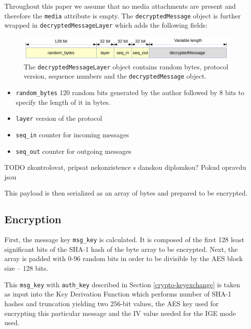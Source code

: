 \documentclass[thesis=M,english]{FITthesis}[2012/10/20]
\begin{document}
Throughout this paper we assume that no media attachments are present and therefore the \texttt{media} attribute is empty. The \texttt{decryptedMessage} object is further wrapped in \texttt{decryptedMessageLayer} which adds the following fields:

\begin{figure}[htb]
	\centering
	\includegraphics[width=1\textwidth]{decrypted-message-layer.pdf}
	\caption{The \texttt{decryptedMessageLayer} object contains random bytes, protocol version, sequence numbers and the \texttt{decryptedMessage} object.}
	\label{img:decrypted-message-layer}
\end{figure}

\begin{itemize}
	\item \texttt{random\_bytes} 120 random bits generated by the author followed by 8 bits to specify the length of it in bytes.
	\item \texttt{layer} version of the protocol
	\item \texttt{seq\_in} counter for incoming messages
	\item \texttt{seq\_out} counter for outgoing messages
\end{itemize}

TODO zkontrolovat, pripsat nekonzistence s danskou diplomkou? Pokud opravdu jsou

This payload is then serialized as an array of bytes and prepared to be encrypted.

\subsection{Encryption}\label{telegram-enc}

First, the message key \texttt{msg\_key} is calculated. It is composed of the first 128 least significant bits of the SHA-1 hash of the byte array to be encrypted. Next, the array is padded with 0-96 random bits in order to be divisible by the AES block size -- 128 bits.

This \texttt{msg\_key} with \texttt{auth\_key} described in Section \ref{crypto-keyexchange} is taken as input into the Key Derivation Function which performs number of SHA-1 hashes and truncation yielding two 256-bit values, the AES key used for encrypting this particular message and the IV value needed for the IGE mode used.
\end{document}
